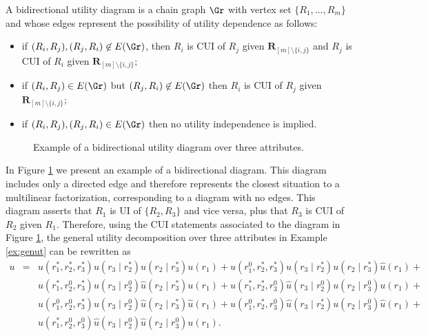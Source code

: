 \begin{definition}
A bidirectional utility diagram is a chain graph $\Gr$ with vertex set $\{R_1,\dots,R_m\}$ and whose edges represent the possibility of utility dependence as follows:
\begin{itemize}
\item if $(R_i,R_j),(R_j,R_i)\not\in E(\Gr)$, then $R_i$ is \gls{CUI} of $R_j$ given $\bm{R}_{[m]\setminus \{i,j\}}$ and  $R_j$ is \gls{CUI} of $R_i$ given  $\bm{R}_{[m]\setminus \{i,j\}}$;
\item if $(R_i,R_j)\in E(\Gr)$ but $(R_j,R_i)\not\in E(\Gr)$ then  $R_i$ is \gls{CUI} of $R_j$ given $\bm{R}_{[m]\setminus \{i,j\}}$;
\item if $(R_i,R_j),(R_j,R_i)\in E(\Gr)$ then no utility independence is implied.
\end{itemize}
\end{definition}

\begin{figure} 
\begin{center}
\end{center}
\caption{Example of a bidirectional utility diagram over three attributes. \label{fig:biut}}
\end{figure}

\begin{example}
In Figure \ref{fig:biut} we present an example of a bidirectional diagram. This diagram includes only a directed edge and therefore represents the closest situation to a multilinear factorization, corresponding to a diagram with no edges. This diagram asserts that $R_1$ is \gls{UI} of $\{R_2,R_3\}$ and vice versa, plus that $R_3$ is \gls{CUI} of $R_2$ given $R_1$. Therefore, using the \gls{CUI} statements associated to the diagram in Figure \ref{fig:biut}, the general utility decomposition over three attributes in Example \ref{ex:genut} can be rewritten as
\begin{eqnarray*}
u&=&u(r_1^*,r_2^*,r_3^*)u(r_3\;|\;r_2^*)u(r_2\;|\; r_3^*)u(r_1)+
u(r_1^0,r_2^*,r_3^*)u(r_3\;|\;r_2^*)u(r_2\;|\; r_3^*)\hat{u}(r_1)+\nonumber\\
&&u(r_1^*,r_2^0,r_3^*)u(r_3\;|\;r_2^0)\hat{u}(r_2\;|\; r_3^*)u(r_1)+
u(r_1^*,r_2^*,r_3^0)\hat{u}(r_3\;|\;r_2^0)u(r_2\;|\; r_3^0)u(r_1)+\nonumber\\
&&u(r_1^0,r_2^0,r_3^*)u(r_3\;|\;r_2^0)\hat{u}(r_2\;|\; r_3^*)\hat{u}(r_1)+
u(r_1^0,r_2^*,r_3^0)\hat{u}(r_3\;|\;r_2^*)u(r_2\;|\; r_3^0)\hat{u}(r_1)+\nonumber\\
&&u(r_1^*,r_2^0,r_3^0)\hat{u}(r_3\;|\;r_2^0)\hat{u}(r_2\;|\; r_3^0)u(r_1).\label{eq:puiexample2}
\end{eqnarray*}
\end{example}

